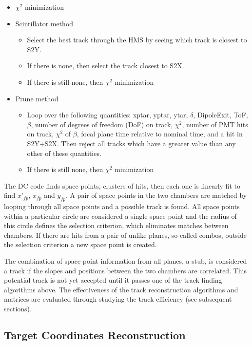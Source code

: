 \documentclass[
]{report}
\begin{document}
\begin{itemize}
  \item $\chi^2$ minimization
  \item Scintillator method
    \begin{itemize}
      \item Select the best track through the HMS by seeing which track is closest to S2Y. 
      \item If there is none, then select the track closest to S2X.
      \item If there is still none, then $\chi^2$ minimization
    \end{itemize}
  \item Prune method
    \begin{itemize}
      \item Loop over the following quantities: xptar, yptar, ytar, $\delta$, DipoleExit, ToF, $\beta$, number of degrees of freedom (DoF) on track, $\chi^2$, number of PMT hits on track, $\chi^2$ of $\beta$, focal plane time relative to nominal time, and a hit in S2Y+S2X. Then reject all tracks which have a greater value than any other of these quantities.
      \item If there is still none, then $\chi^2$ minimization
    \end{itemize}
\end{itemize}

The DC code finds space points, clusters of hits, then each one is
linearly fit to find \(x’_{fp}\), \(x_{fp}\) and \(y_{fp}\). A pair of
space points in the two chambers are matched by looping through all
space points and a possible track is found. All space points within a
particular circle are considered a single space point and the radius of
this circle defines the selection criterion, which eliminates matches
between chambers. If there are hits from a pair of unlike planes, so
called combos, outside the selection criterion a new space point is
created.

The combination of space point information from all planes, a stub, is
considered a track if the slopes and positions between the two chambers
are correlated. This potential track is not yet accepted until it passes
one of the track finding algorithms above. The effectiveness of the
track reconstruction algorithms and matrices are evaluated through
studying the track efficiency (see subsequent sections).

\hypertarget{target-coordinates-reconstruction}{%
\subsection{Target Coordinates
Reconstruction}\label{target-coordinates-reconstruction}}
\end{document}
